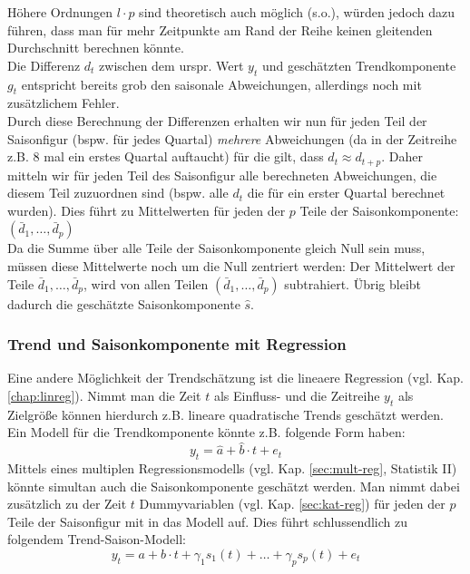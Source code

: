 \documentclass[a4paper]{article}
\newcommand\dangersign[1][2ex]{%
  \renewcommand\stacktype{L}%
  \scaleto{\stackon[1.3pt]{\color{red}$\triangle$}{\tiny !}}{#1}%
}
\begin{document}
\noindent \dangersign[3ex] Höhere Ordnungen $l \cdot p$ sind theoretisch auch möglich (s.o.), würden jedoch dazu führen, dass man für mehr Zeitpunkte am Rand der Reihe keinen gleitenden Durchschnitt berechnen könnte.\\

\noindent Die Differenz $d_t$ zwischen dem urspr. Wert $y_t$ und geschätzten Trendkomponente $g_t$ entspricht bereits grob den saisonale Abweichungen, allerdings noch mit zusätzlichem Fehler.\\
Durch diese Berechnung der Differenzen erhalten wir nun für jeden Teil der Saisonfigur (bspw. für jedes Quartal) \textit{mehrere} Abweichungen (da in der Zeitreihe z.B. 8 mal ein erstes Quartal auftaucht) für die gilt, dass $d_t\approx d_{t+p}$. Daher mitteln wir für jeden Teil des Saisonfigur alle berechneten Abweichungen, die diesem Teil zuzuordnen sind (bspw. alle $d_t$ die für ein erster Quartal berechnet wurden). Dies führt zu Mittelwerten für jeden der $p$ Teile der Saisonkomponente: $(\bar{d}_1, \hdots, \bar{d}_p)$\\
Da die Summe über alle Teile der Saisonkomponente gleich Null sein muss, müssen diese Mittelwerte noch um die Null zentriert werden: Der Mittelwert der Teile $\bar{d}_1, \hdots, \bar{d}_p$, wird von allen Teilen $(\bar{d}_1, \hdots, \bar{d}_p)$ subtrahiert. Übrig bleibt dadurch die geschätzte Saisonkomponente $\hat{s}$.

\subsubsection{Trend und Saisonkomponente mit Regression}
Eine andere Möglichkeit der Trendschätzung ist die lineaere Regression (vgl. Kap. \ref{chap:linreg}). Nimmt man die Zeit $t$ als Einfluss- und die Zeitreihe $y_t$ als Zielgröße können hierdurch z.B. lineare quadratische Trends geschätzt werden. Ein Modell für die Trendkomponente könnte z.B. folgende Form haben: 
$$y_t=\hat{a}+\hat{b}\cdot t + e_t$$
\noindent Mittels eines multiplen Regressionsmodells (vgl. Kap. \ref{sec:mult-reg}, Statistik II) könnte simultan auch die Saisonkomponente geschätzt werden. Man nimmt dabei zusätzlich zu der Zeit $t$ Dummyvariablen (vgl. Kap. \ref{sec:kat-reg}) für jeden der $p$ Teile der Saisonfigur mit in das Modell auf. Dies führt schlussendlich zu folgendem Trend-Saison-Modell:
$$y_t=a + b \cdot t + \gamma_1 s_1(t) + \hdots + \gamma_{p} s_{p}(t) + e_t$$
\end{document}
